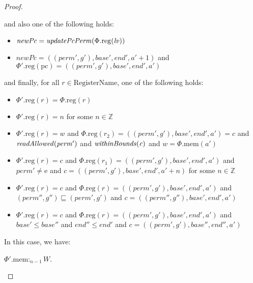 \documentclass[a4paper]{article}
\newcommand{\update}[2]{[#1 \mapsto #2]}
\newcommand{\var}[1]{\mathit{#1}}
\newcommand{\lv}{\var{lv}}
\newcommand{\gl}{\var{g}}
\newcommand{\pcreg}{\mathrm{pc}}
\newcommand{\addr}{\var{a}}
\newcommand{\start}{\var{base}}
\newcommand{\addrend}{\var{end}}
\newcommand{\heap}{\var{mem}}
\newcommand{\perm}{\var{perm}}
\newcommand{\plainproj}[1]{\mathrm{#1}}
\newcommand{\memheap}[1][\Phi]{#1.\plainproj{mem}}
\newcommand{\memreg}[1][\Phi]{#1.\plainproj{reg}}
\newcommand{\plainfun}[2]{
  \ifthenelse{\equal{#2}{}}
  {\mathit{#1}}
  {\mathit{#1}(#2)}
}
\newcommand{\updatePcPerm}[1]{\plainfun{updatePcPerm}{#1}}
\newcommand{\readAllowed}[1]{\plainfun{readAllowed}{#1}}
\newcommand{\writeAllowed}[1]{\plainfun{writeAllowed}{#1}}
\newcommand{\withinBounds}[1]{\plainfun{withinBounds}{#1}}
\newcommand{\heapSat}[3][\heap]{#1 :_{#2} #3}
\newcommand{\plaindom}[1]{\mathrm{#1}}
\newcommand{\RegName}{\plaindom{RegisterName}}
\newcommand{\ints}{\mathbb{Z}}
\newcommand{\plainperm}[1]{\mathrm{#1}}
\newcommand{\entry}{\plainperm{e}}
\newcommand{\local}{\plainperm{local}}
\begin{document}
\begin{proof}
\begin{enumproof}
    and also one of the following holds:
    \begin{itemize}
    \item $\var{newPc}= \updatePcPerm{\memreg(\lv)}$
    \item $\var{newPc} = ((\perm',\gl'),\start',\addrend',\addr' + 1)$ and
      $\memreg[\Phi'](\pcreg) = ((\perm',\gl'),\start',\addrend',\addr')$
    \end{itemize}
    and finally, for all $r \in \RegName$, one of the following
    holds:
    \begin{itemize}
    \item $\memreg[\Phi'](r) = \memreg[\Phi](r)$
    \item $\memreg[\Phi'](r) = n$ for some $n \in \ints$
    \item $\memreg[\Phi'](r) = \var{w}$ and $\memreg(r_2) =
      ((\perm',\gl'),\start',\addrend',\addr') = \var{c}$ and
      $\readAllowed{\perm'}$ and $\withinBounds{\var{c}}$ and $\var{w} =
      \memheap(\addr')$
    \item $\memreg[\Phi'](r) = \var{c}$ and $\memreg(r_1) =
      ((\perm',\gl'),\start',\addrend',\addr')$ and $\perm' \neq \entry$ and
      $\var{c} = ((\perm',\gl'),\start',\addrend',\addr' + n)$ for some $n \in
      \ints$
    \item $\memreg[\Phi'](r) = \var{c}$ and $\memreg(r) =
      ((\perm',\gl'),\start',\addrend',\addr')$ and $(\perm'',\gl'')\sqsubseteq
      (\perm',\gl')$ and $c = ((\perm'',\gl''),\start',\addrend',\addr')$
    \item $\memreg[\Phi'](r) = \var{c}$ and $\memreg(r) =
      ((\perm',\gl'),\start',\addrend',\addr')$ and $\start' \leq \start''$ and
      $\addrend'' \leq \addrend'$ and $c =
      ((\perm',\gl'),\start'',\addrend'',\addr')$
    \end{itemize}
    In this case, we have:
    \begin{enumproof}
    \item $\heapSat[{\memheap[\Phi']}]{n-1}{W}$.
\end{enumproof}
\end{enumproof}
\end{proof}
\end{document}
